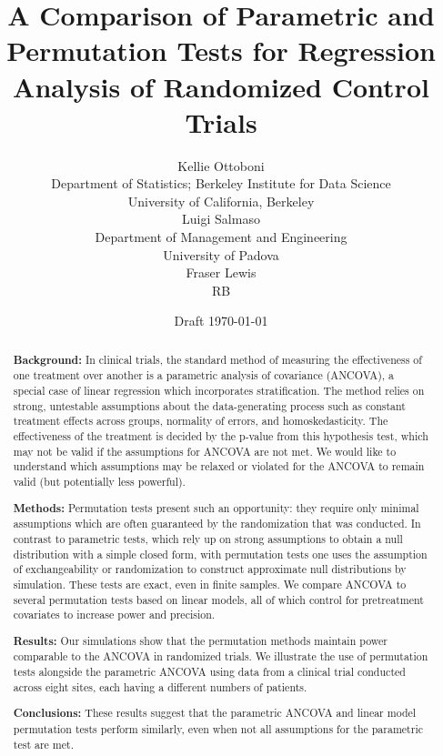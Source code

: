 \documentclass[11pt]{article}
\title{A Comparison of Parametric and Permutation Tests for Regression Analysis of Randomized Control Trials}
\author{Kellie Ottoboni \\
Department of Statistics; Berkeley Institute for Data Science\\
University of California, Berkeley\\ [.2in]
Luigi Salmaso\\
Department of Management and Engineering \\
University of Padova \\ [.2in]
Fraser Lewis \\
RB
}\date{Draft \today}
\begin{document}
\maketitle

\newpage

\begin{abstract}
\noindent\textbf{Background:}
In clinical trials, the standard method of measuring the effectiveness of one treatment over another is a parametric analysis of covariance (ANCOVA), a special case of linear regression which incorporates stratification.
The method relies on strong, untestable assumptions about the data-generating process such as constant treatment effects across groups, normality of errors, and homoskedasticity.
The effectiveness of the treatment is decided by the p-value from this hypothesis test, which may not be valid if the assumptions for ANCOVA are not met.
We would like to understand which assumptions may be relaxed or violated for the ANCOVA to remain valid (but potentially less powerful).

\noindent\textbf{Methods:}
Permutation tests present such an opportunity: they require only minimal assumptions which are often guaranteed by the randomization that was conducted.
In contrast to parametric tests, which rely up on strong assumptions to obtain a null distribution with a simple closed form, with permutation tests one uses the assumption of exchangeability or randomization to construct approximate null distributions by simulation.
These tests are exact, even in finite samples.
We compare ANCOVA to several permutation tests based on linear models, all of which control for pretreatment covariates to increase power and precision.

\noindent\textbf{Results:}
Our simulations show that the permutation methods maintain power comparable to the ANCOVA in randomized trials.
We illustrate the use of permutation tests alongside the parametric ANCOVA using data from a clinical trial conducted across eight sites,
each having a different numbers of patients.

\noindent\textbf{Conclusions:}
These results suggest that the parametric ANCOVA and linear model permutation tests perform similarly, even when not all assumptions for the parametric test are met.


\end{abstract}

\newpage
\end{document}
